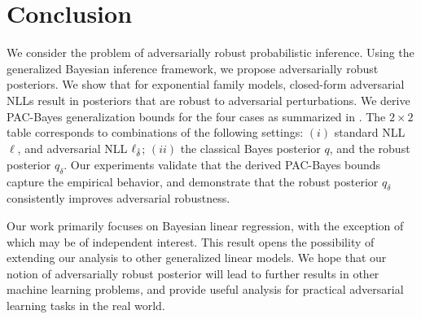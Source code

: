 \section{Conclusion}
\label{sec:conclusion}

We consider the problem of adversarially robust probabilistic inference.
Using the generalized Bayesian inference framework, we propose adversarially robust posteriors.
We show that for exponential family models, closed-form  adversarial NLLs %
result in posteriors that are robust to adversarial perturbations.
We derive PAC-Bayes generalization bounds for the four cases as summarized in .
The $2\times 2$ table corresponds to combinations of the following settings:
$(i)$ standard NLL $\ell$, and adversarial NLL $\ell_{\hat{\delta}}$;
$(ii)$ the classical Bayes posterior $q$, and the robust posterior $q_\delta$.
Our experiments validate that the derived PAC-Bayes bounds capture the empirical behavior, and demonstrate that the robust posterior $q_\delta$ consistently improves adversarial robustness.

Our work primarily focuses on Bayesian linear regression, with the exception of  which may be of independent interest. 
This result opens the possibility of extending our analysis to other generalized linear models. 
We hope that our notion of adversarially robust posterior
will lead to further results in other machine learning problems, and provide useful analysis
for practical adversarial learning tasks in the real world.